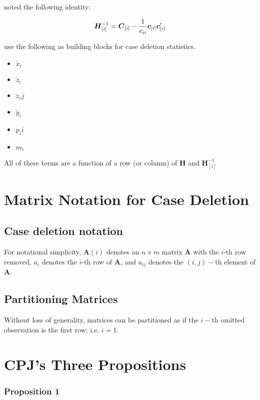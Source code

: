 \documentclass[12pt, a4paper]{report}
\theoremstyle{plain}
\theoremstyle{definition}
\theoremstyle{remark}
\begin{document}
\citet{CPJ} noted the following identity:

\[ \boldsymbol{H}_{[i]}^{-1}  = \boldsymbol{C}_{[i]} - {1 \over c_{ii}}\boldsymbol{c}_{[i]}\boldsymbol{c}_{[i]}^{\prime} \]


\citet{CPJ} use the following as building blocks for case deletion statistics.
\begin{itemize}
\item $\breve{x}_i$
\item $\breve{z}_i$
\item $\breve{z}_ij$
\item $\breve{y}_i$
\item $p_ii$
\item $m_i$
\end{itemize}
All of these terms are a function of a row (or column) of $\boldsymbol{H}$ and $\boldsymbol{H}_{[i]}^{-1}$

\newpage
\section{Matrix Notation for Case Deletion} %

\subsection{Case deletion notation} %

For notational simplicity, $\boldsymbol{A}(i)$ denotes an $n \times m$ matrix $\boldsymbol{A}$ with the $i$-th row
removed, $a_i$ denotes the $i$-th row of $\boldsymbol{A}$, and $a_{ij}$ denotes the $(i, j)-$th element of $\boldsymbol{A}$.

\subsection{Partitioning Matrices} %
Without loss of generality, matrices can be partitioned as if the $i-$th omitted observation is the first row; i.e. $i=1$.

\newpage
\section{CPJ's Three Propositions} %


\subsubsection{Proposition 1}
\end{document}
